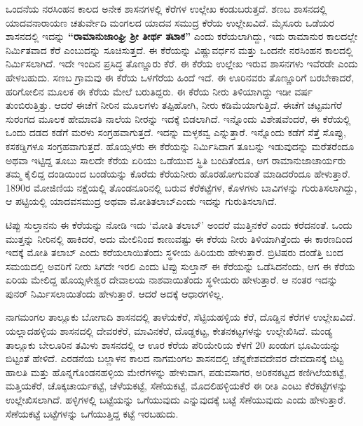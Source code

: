 ಒಂದನೆಯ ನರಸಿಂಹನ ಕಾಲದ ಅನೇಕ ಶಾಸನಗಳಲ್ಲಿ ಕೆರೆಗಳ ಉಲ್ಲೇಖ ಕಂಡುಬರುತ್ತದೆ. ಶಣಬ ಶಾಸನದಲ್ಲಿ ಯಾದವನಾರಾಯಣ ಚತುರ್ವೇದಿ ಮಂಗಲದ ಯಾದವ ಸಮುದ್ರ ಕೆರೆಯ ಉಲ್ಲೇಖವಿದೆ. ಮೈಸೂರು ಒಡೆಯರ ಶಾಸನದಲ್ಲಿ ಇದನ್ನು \textbf{“ರಾಮಾನುಜಾಂಘ್ರಿ ಶ‍್ರೀ ತೀರ್ಥ ತಟಾಕ”} ಎಂದು ಕರೆಯಲಾಗಿದ್ದು, ಇದು ರಾಮಾನುರ ಕಾಲದಲ್ಲೇ ನಿರ್ಮಿತವಾದ ಕೆರೆ ಎಂಬುದನ್ನು ಸೂಚಿಸುತ್ತದೆ. ಈ ಕೆರೆಯನ್ನು ವಿಷ್ಣುವರ್ಧನ ಮತ್ತು ಒಂದನೇ ನರಸಿಂಹನ ಕಾಲದಲ್ಲಿ ನಿರ್ಮಿಸಲಾಗಿದೆ. ಇದೇ ಇಂದಿನ ಪ್ರಸಿದ್ಧ ತೊಣ್ಣೂರು ಕೆರೆ. ಈ ಕೆರೆಯ ಉಲ್ಲೇಖ ಇರುವ ಶಾಸನಗಳು ಇವೆರಡೇ ಎಂದು ಹೇಳಬಹುದು. ಸಣಬ ಗ್ರಾಮವು ಈ ಕೆರೆಯ ಒಳಗೆರೆಯ ಹಿಂದೆ ಇದೆ. ಈ ಊರಿನವರು ತೊಣ್ಣೂರಿಗೆ ಬರಬೇಕಾದರೆ, ಹರಿಗೋಲಿನ ಮೂಲಕ ಈ ಕೆರೆಯ ಮೇಲೆ ಬರುತಿದ್ದರು. ಈ ಕೆರೆಯ ನೀರು ತಿಳಿಯಾಗಿದ್ದು ಇಡೀ ವರ್ಷ ತುಂಬಿರುತ್ತಿತ್ತು. ಆದರೆ ಈಚೆಗೆ ನೀರಿನ ಮೂಲಗಳು ತಪ್ಪಿಹೋಗಿ, ನೀರು ಕಡಿಮೆಯಾಗುತ್ತಿದೆ. ಈಚೆಗೆ ಚಟ್ಟಮಗೆರೆ ಸುರಂಗದ ಮೂಲಕ ಹೇಮಾವತಿ ನಾಲೆಯ ನೀರನ್ನು ಇದಕ್ಕೆ ಬಿಡಲಾಗಿದೆ. ಇನ್ನೊಂದು ವಿಶೇಷವೆಂದರೆ, ಈ ಕೆರೆಯಲ್ಲಿ ಒಂದು ದಡದ ಕಡೆಗೆ ಮರಳು ಸಂಗ್ರಹವಾಗುತ್ತದೆ. ಇದನ್ನು ಮಳ್ಳಕವ್ವ ಎನ್ನುತ್ತಾರೆ. ಇನ್ನೊಂದು ಕಡೆಗೆ ಸೆತ್ತೆ ಸೊಪ್ಪು, ಕಸಕಡ್ಡಿಗಳೂ ಸಂಗ್ರಹವಾಗುತ್ತದೆ. ಹೊಯ್ಸಳರು ಈ ಕೆರೆಯನ್ನು ನಿರ್ಮಿಸಿದಾಗ ತೂಬನ್ನು ಇಡುವುದನ್ನು ಮರೆತರೆಂದೂ ಅಥವಾ ಇಟ್ಟಿದ್ದ ತೂಬು ಸಾಲದೇ ಕೆರೆಯ ಏರಿಯು ಒಡೆಯುವ ಸ್ಥಿತಿ ಬಂದಿತೆಂದೂ, ಆಗ ರಾಮಾನುಜಾಚಾರ್ಯರು ತಮ್ಮ ಕೈಲಿದ್ದ ದಂಡಿಯಿಂದ ಬಂಡೆಯನ್ನು ಕೊರೆದು ಕೆರೆಯನೀರು ಹೊರಹೋಗುವಂತೆ ಮಾಡಿದರೆಂದೂ ಹೇಳುತ್ತಾರೆ. 1890ರ ಮೋಜಿಣಿಯ ನಕ್ಷೆಯಲ್ಲಿ ತೊಂಡನೂರಿನಲ್ಲಿ ಬರುವ ಕೆರೆಕಟ್ಟೆಗಳ, ಕೊಳಗಳು ಬಾವಿಗಳನ್ನು ಗುರುತಿಸಲಾಗಿದ್ದು, ಆ ಪಟ್ಟಿಯಲ್ಲಿ ಯಾದವಸಮುದ್ರ ಅಥವಾ ಮೋತಿತಲಾಬ್​ ಎಂದು ಇದನ್ನು ಗುರುತಿಸಲಾಗಿದೆ.

\newpage

ಟಿಪ್ಪು ಸುಲ್ತಾನನು ಈ ಕೆರೆಯನ್ನು ನೋಡಿ ಇದು ‘ಮೋತಿ ತಲಾಬ್’ ಅಂದರೆ ಮುತ್ತಿನಕೆರೆ ಎಂದು ಕರೆದನಂತೆ. ಒಂದು ಮುತ್ತನ್ನು ನೀರಿನಲ್ಲಿ ಹಾಕಿದರೆ, ಅದು ಮೇಲಿನಿಂದ ಕಾಣುವಷ್ಟು ಈ ಕೆರೆಯ ನೀರು ತಿಳಿಯಾಗಿತ್ತೆಂದು ಈ ಕಾರಣದಿಂದ ಇದಕ್ಕೆ ಮೋತಿ ತಲಾಬ್ ಎಂದು ಕರೆಯಲಾಯಿತೆಂದು ಸ್ಥಳೀಯ ಹಿರಿಯರು ಹೇಳುತ್ತಾರೆ. ಬ್ರಿಟಿಷರು ದಂಡೆತ್ತಿ ಬಂದ ಸಮಯದಲ್ಲಿ ಅವರಿಗೆ ನೀರು ಸಿಗದೇ ಇರಲಿ ಎಂದು ಟಿಪ್ಪು ಸುಲ್ತಾನ್ ಈ ಕೆರೆಯನ್ನು ಒಡೆಸಿದನೆಂದು, ಆಗ ಈ ಕೆರೆಯ ಏರಿಯ ಮೇಲಿದ್ದ ಹೊಯ್ಸಳೇಶ್ವರ ದೇವಾಲಯ ನಾಶವಾಯಿತೆಂದು ಸ್ಥಳೀಯರು ಹೇಳುತ್ತಾರೆ. ಆ ನಂತರ ಇದನ್ನು ಪುನರ್ ನಿರ್ಮಿಸಲಾಯಿತೆಂದು ಹೇಳುತ್ತಾರೆ. ಆದರೆ ಅದಕ್ಕೆ ಆಧಾರಗಳಿಲ್ಲ.

\vskip 2pt

ನಾಗಮಂಗಲ ತಾಲ್ಲೂಕು ಬೋಗಾದಿ ಶಾಸನದಲ್ಲಿ ತಾಳೆಯಕೆರೆ, ಸೆಟ್ಟಿಯಹಳ್ಳಿಯ ಕೆರೆ, ದೊಡ್ಡಿನ ಕೆರೆಗಳ ಉಲ್ಲೇಖ\-ವಿದೆ. ಯಲ್ಲಾದಹಳ್ಳಿಯ ಶಾಸನದಲ್ಲಿ ದೇವರಕೆರೆ, ಮಾವಿನಕೆರೆ, ದೊಡ್ಡಕಟ್ಟ, ಕೇತನಕಟ್ಟಗಳನ್ನು ಉಲ್ಲೇಖಿಸಿದೆ. ಮಂಡ್ಯ ತಾಲ್ಲೂಕು ಬೇಲೂರಿನ ತಮಿಳು ಶಾಸನದಲ್ಲಿ ಆ ಊರ ಕೆರೆಯ ಪೆರಿಯೇರಿಯ ಕೆಳಗೆ 20 ಖಂಡುಗ ಭೂಮಿಯನ್ನು ಬಿಟ್ಟಂತೆ ಹೇಳಿದೆ. ಎರಡನೆಯ ಬಲ್ಲಾಳನ ಕಾಲದ ನಾಗಮಂಗಲ ಶಾಸನದಲ್ಲಿ ಚೆನ್ನಕೇಶವದೇವರ ದೇವದಾನಕ್ಕೆ ಬಿಟ್ಟ ಹಾಲತಿ ಮತ್ತು ಹೊನ್ನಗೊಂಡನಹಳ್ಳಿಯ ಮೇರೆಗಳನ್ನು ಹೇಳುವಾಗ, ಪಡುವಸಾಗರ, ಅರಿಕನಕಟ್ಟದ ಕಣಿಗಿಲೆಯಕಟ್ಟೆ, ಮತ್ತಿಯಕೆರೆ, ಚೊಕ್ಕಚಾರ್ಯಕಟ್ಟೆ, ಚೆಳೆಯಕಟ್ಟೆ, ಸೆಣೆಯಕಟ್ಟೆ, ಮೊದಲಿಹಳ್ಳಿಯಕೆರೆ ಈ ರೀತಿ ಎಂಟು ಕೆರೆಕಟ್ಟೆಗಳನ್ನು ಉಲ್ಲೇಖಿಸಲಾಗಿದೆ. ಹಳ್ಳಿಗಳಲ್ಲಿ ಬಟ್ಟೆಯನ್ನು ಒಗೆಯುವುದು ಎನ್ನುವುದಕ್ಕೆ ಬಟ್ಟೆ ಸೆಣೆಯುವುದು ಎಂದು ಹೇಳುತ್ತಾರೆ. ಸೆಣೆಯಕಟ್ಟೆ ಬಟ್ಟೆಗಳನ್ನು ಒಗೆಯುತ್ತಿದ್ದ ಕಟ್ಟೆ ಇರಬಹುದು.

